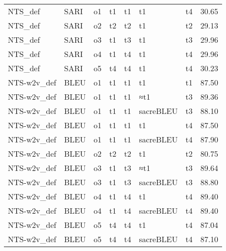 \begin{tabular}{lllllllr}
     NTS\_def &      SARI &     o1 &         t1 &       t1 &         t1 &           t4 &                   30.65 \\
     NTS\_def &      SARI &     o2 &         t2 &       t2 &         t1 &           t2 &                   29.13 \\
     NTS\_def &      SARI &     o3 &         t1 &       t3 &         t1 &           t3 &                   29.96 \\
     NTS\_def &      SARI &     o4 &         t1 &       t4 &         t1 &           t4 &                   29.96 \\
     NTS\_def &      SARI &     o5 &         t4 &       t4 &         t1 &           t4 &                   30.23 \\
 NTS-w2v\_def &      BLEU &     o1 &         t1 &       t1 &         t1 &           t1 &                   87.50 \\
 NTS-w2v\_def &      BLEU &     o1 &         t1 &       t1 &        ≈t1 &           t3 &                   89.36 \\
 NTS-w2v\_def &      BLEU &     o1 &         t1 &       t1 &  sacreBLEU &           t3 &                   88.10 \\
 NTS-w2v\_def &      BLEU &     o1 &         t1 &       t1 &         t1 &           t4 &                   87.50 \\
 NTS-w2v\_def &      BLEU &     o1 &         t1 &       t1 &  sacreBLEU &           t4 &                   87.90 \\
 NTS-w2v\_def &      BLEU &     o2 &         t2 &       t2 &         t1 &           t2 &                   80.75 \\
 NTS-w2v\_def &      BLEU &     o3 &         t1 &       t3 &        ≈t1 &           t3 &                   89.64 \\
 NTS-w2v\_def &      BLEU &     o3 &         t1 &       t3 &  sacreBLEU &           t3 &                   88.80 \\
 NTS-w2v\_def &      BLEU &     o4 &         t1 &       t4 &         t1 &           t4 &                   89.40 \\
 NTS-w2v\_def &      BLEU &     o4 &         t1 &       t4 &  sacreBLEU &           t4 &                   89.40 \\
 NTS-w2v\_def &      BLEU &     o5 &         t4 &       t4 &         t1 &           t4 &                   87.04 \\
 NTS-w2v\_def &      BLEU &     o5 &         t4 &       t4 &  sacreBLEU &           t4 &                   87.10 \\

\end{tabular}
